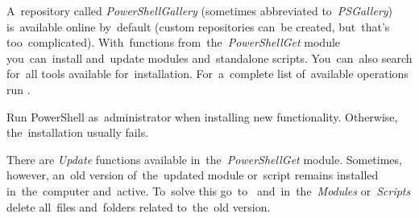 A~repository called \textit{PowerShellGallery} (sometimes abbreviated to~\textit{PSGallery}) is~available online by~default (custom repositories can~be created, but~that's too~complicated).
With~functions from~the~\textit{PowerShellGet} module you~can~install and~update modules and~standalone scripts.
You~can~also search for~all tools available for~installation.
For~a~complete list of~available operations run .

\warning Run PowerShell as~administrator when installing new functionality.
Otherwise, the~installation usually fails.

There are \textit{Update} functions available in~the~\textit{PowerShellGet} module.
Sometimes, however, an~old version of~the~updated module or~script remains installed in~the~computer and~active.
To~solve this go~to~ and~in~the~\textit{Modules} or~\textit{Scripts} delete all~files and~folders related to~the~old version.
